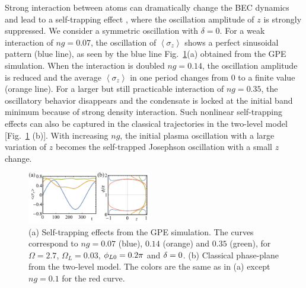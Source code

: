 \documentclass[twocolumn,prl,floatfix,citeautoscript,nofootinbib,superscriptaddress]{revtex4}
\begin{document}
Strong interaction between atoms can dramatically change the BEC dynamics
and lead to a self-trapping effect \cite{Raghavan1999,Albiez2005}, where the
oscillation amplitude of $z$ is strongly suppressed. We consider a symmetric
oscillation with $\delta =0$. For a weak interaction of $ng=0.07$, the
oscillation of $\left\langle \sigma _{z}\right\rangle $ shows a perfect
sinusoidal pattern (blue line), as seen by the blue line Fig.~\ref{fig5}(a)
obtained from the GPE simulation. When the interaction is doubled $ng=0.14$,
the oscillation amplitude is reduced and the average $\left\langle \sigma
_{z}\right\rangle $ in one period changes from $0$ to a finite value (orange
line). For a larger but still practicable interaction of $ng=0.35$, the
oscillatory behavior disappears and the condensate is locked at the initial
band minimum because of strong density interaction. Such nonlinear
self-trapping effects can also be captured in the classical trajectories in
the two-level model [Fig.~\ref{fig5} (b)]. With increasing $ng$, the initial
plasma oscillation with a large variation of $z$ becomes the self-trapped
Josephson oscillation with a small $z$ change. %

\begin{figure}[t]
\centering
\includegraphics[width=0.48\textwidth]{Fig5.pdf}
\caption{(a) Self-trapping effects from the GPE simulation. The curves
correspond to $ng=0.07$ (blue), $0.14$ (orange) and $0.35$ (green), for $%
\Omega =2.7$, $\Omega _{L}=0.03$, $\protect\phi _{L0}=0.2\protect\pi $ and $%
\protect\delta =0$. (b) Classical phase-plane from the two-level model. The
colors are the same as in (a) except $ng=0.1$ for the red curve.}
\label{fig5}
\end{figure}
\end{document}
